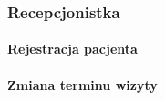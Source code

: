 \documentclass[polish,12pt]{aghthesis}
\begin{document}
\subsubsection{Recepcjonistka}
    \paragraph{Rejestracja pacjenta}{}
    \paragraph{Zmiana terminu wizyty}{}


\listoffigures 
\listoftables

\nocite{artykul2011,ksiazka2011,narzedzie2011,projekt2011}


\end{document}
